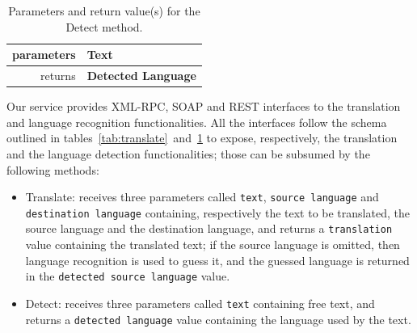 \documentclass[11pt]{article}
\begin{document}
\begin{table}[!ht]
\begin{center}
 \begin{tabular}{|r|l|}
  \hline
   parameters	& {\bf Text} \\
  \hline \hline
   returns 	& {\bf Detected Language}\\
  \hline
 \end{tabular}
\end{center}
\caption{Parameters and return value(s) for the Detect method.}
\label{tab:detect}
\end{table}


Our service provides XML-RPC, SOAP and REST interfaces to the translation and language 
recognition functionalities. All the interfaces follow the schema outlined in 
tables~\ref{tab:translate}~and~\ref{tab:detect} to expose, respectively, the translation 
and the language detection functionalities; those can be subsumed by the following methods:

\begin{itemize}
 \item Translate: receives three parameters called {\tt\small text}, {\tt\small source~language} 
       and {\tt\small destination language} containing, respectively the text to be translated, 
       the source language and the destination language, and returns a {\tt\small translation} 
       value containing the translated text; if the source language is omitted, then language 
       recognition is used to guess it, and the guessed language is returned in the 
       {\tt\small detected source language} value.
 \item Detect: receives three parameters called {\tt\small text} containing free text, and 
       returns a {\tt\small detected language} value containing the language used by the text.
\end{itemize}
\end{document}
